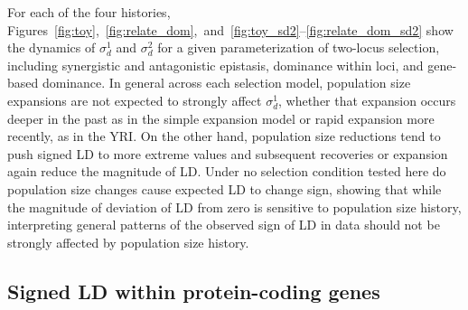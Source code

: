 \documentclass[]{article}
\begin{document}
For each of the four histories,
Figures~\ref{fig:toy},~\ref{fig:relate_dom},~and~\ref{fig:toy_sd2}--\ref{fig:relate_dom_sd2}
show the dynamics of \(\sigma_d^1\) and \(\sigma_d^2\) for a given
parameterization of two-locus selection, including synergistic and antagonistic
epistasis, dominance within loci, and gene-based dominance. In general across
each selection model, population size expansions are not expected to strongly
affect \(\sigma_d^1\), whether that expansion occurs deeper in the past as in
the simple expansion model or rapid expansion more recently, as in the YRI. On
the other hand, population size reductions tend to push signed LD to more
extreme values and subsequent recoveries or expansion again reduce the
magnitude of LD. Under no selection condition tested here do population size
changes cause expected LD to change sign, showing that while the magnitude of
deviation of LD from zero is sensitive to population size history, interpreting
general patterns of the observed sign of LD in data should not be strongly
affected by population size history.

\subsection{Signed LD within protein-coding genes}
\end{document}
